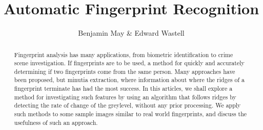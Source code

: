 \documentclass[11pt,a4paper]{article}
\title{Automatic Fingerprint Recognition}
\author{Benjamin May \& Edward Wastell}
\begin{document}
    \maketitle

    \begin{abstract}
      Fingerprint analysis has many applications, from biometric identification to crime scene investigation. If fingerprints are to be used, a method for quickly and accurately determining if two fingerprints come from the same person. Many approaches have been proposed, but minutia extraction, where information about where the ridges of a fingerprint terminate has had the most success. In this articles, we shall explore a method for investigating such features by using an algorithm that follows ridges by detecting the rate of change of the greylevel, without any prior processing. We apply such methods to some sample images similar to real world fingerprints, and discuss the usefulness of such an approach.
    \end{abstract}
\end{document}
